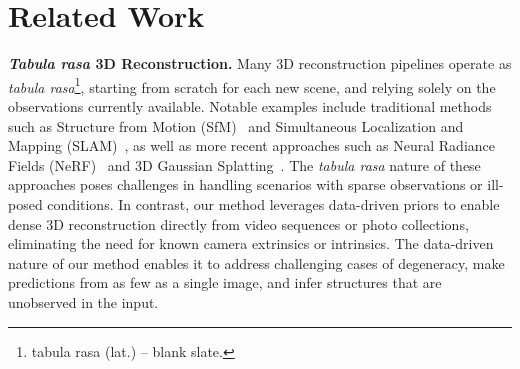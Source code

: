 \section{Related Work}

\noindent\textbf{\textit{Tabula rasa} 3D Reconstruction.} Many 3D reconstruction pipelines operate as \textit{tabula rasa}\footnote{tabula rasa (lat.) -- blank slate.}, starting from scratch for each new scene, and relying solely on the observations  currently available.
Notable examples include traditional methods such as Structure from Motion (SfM)~\cite{agarwal2011building,schoenberger2016sfm,snavely2006photo,snavely2008modeling,lowe2004distinctive,hartley2003multiple,triggs2000bundle,agarwal2010bundle,seitz2006comparison} and Simultaneous Localization and Mapping (SLAM)~\cite{cadena2016past,durrant2006simultaneous,davison2007monoslam,mur2015orb,engel2014lsd,klein2007parallel,newcombe2011dtam}, as well as more recent approaches such as Neural Radiance Fields (NeRF)~\cite{mildenhall2021nerf,muller2022instant,chen2022tensorf,fridovich2022plenoxels,wang2021neus} and 3D Gaussian Splatting~\cite{kerbl20233d}. The \textit{tabula rasa} nature of these approaches poses challenges in handling scenarios with sparse observations or ill-posed conditions. In contrast, our method leverages data-driven priors to enable dense 3D reconstruction directly from video sequences or photo collections, eliminating the need for known camera extrinsics or intrinsics.  
The data-driven nature of our method enables it to address challenging cases of degeneracy, make predictions from as few as a single image, and infer structures that are unobserved in the input.



